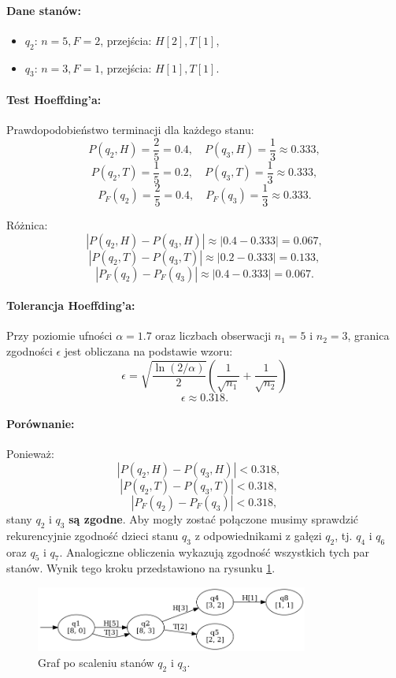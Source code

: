 \paragraph*{Dane stanów:}  
\begin{itemize}  
    \item \( q_2 \): \( n = 5, F = 2 \), przejścia: \( H[2], T[1] \), 
    \item \( q_3 \): \( n = 3, F = 1 \), przejścia: \( H[1], T[1] \).  
\end{itemize}  

\paragraph*{Test Hoeffding’a:}  
Prawdopodobieństwo terminacji dla każdego stanu:  
\[
P(q_2, H) = \frac{2}{5} = 0.4, \quad P(q_3, H) = \frac{1}{3} \approx 0.333,
\]
\[
P(q_2, T) = \frac{1}{5} = 0.2, \quad P(q_3, T) = \frac{1}{3} \approx 0.333,
\]
\[
P_F(q_2) = \frac{2}{5} = 0.4, \quad P_F(q_3) = \frac{1}{3} \approx 0.333.
\]

Różnica:  
\[
|P(q_2, H) - P(q_3, H)| \approx |0.4 - 0.333| = 0.067,
\]
\[
|P(q_2, T) - P(q_3, T)| \approx |0.2 - 0.333| = 0.133,
\]
\[
|P_F(q_2) - P_F(q_3)| \approx |0.4 - 0.333| = 0.067.
\]

\paragraph*{Tolerancja Hoeffding’a:}  
Przy poziomie ufności \( \alpha = 1.7 \) oraz liczbach obserwacji \( n_1 = 5 \) i \( n_2 = 3 \), granica zgodności \( \epsilon \) jest obliczana na podstawie wzoru:  
\[
\epsilon = \sqrt{\frac{\ln(2 / \alpha)}{2}} \left( \frac{1}{\sqrt{n_1}} + \frac{1}{\sqrt{n_2}} \right)
\]
\[
\epsilon \approx 0.318.
\]

\paragraph*{Porównanie:}  
Ponieważ:  
\[
|P(q_2, H) - P(q_3, H)| < 0.318, \quad
\]
\[
|P(q_2, T) - P(q_3, T)| < 0.318, \quad
\]
\[
|P_F(q_2) - P_F(q_3)| < 0.318,
\]  
stany \( q_2 \) i \( q_3 \) \textbf{są zgodne}. Aby mogły zostać połączone musimy sprawdzić rekurencyjnie zgodność dzieci stanu $q_3$ z odpowiednikami z gałęzi $q_2$, tj. $q_4$ i $q_6$ oraz $q_5$ i $q_7$. Analogiczne obliczenia wykazują zgodność wszystkich tych par stanów. Wynik tego kroku przedstawiono na rysunku \ref{fig:alergia_example_1}.  

\begin{figure}[ht]
    \centering
    \includegraphics[width=0.8\textwidth]{images/run_example/alergia/1.png}
    \caption{Graf po scaleniu stanów \( q_2 \) i \( q_3 \).}
    \label{fig:alergia_example_1}
\end{figure}

